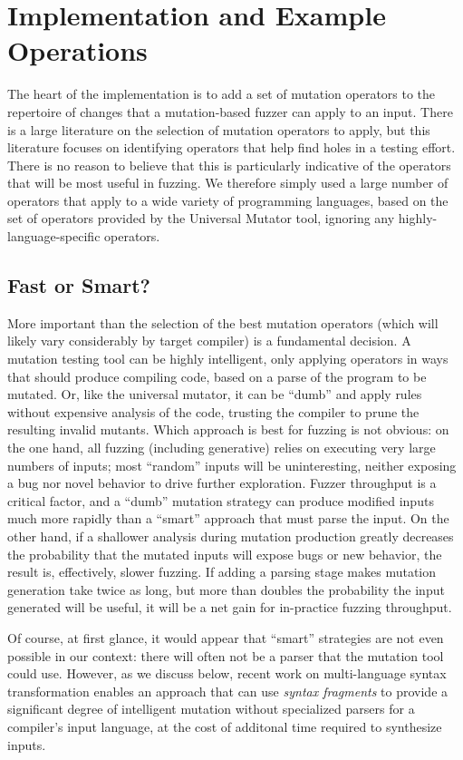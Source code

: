 \section{Implementation and Example Operations}

The heart of the implementation is to add a set of mutation operators
to the repertoire of changes that a mutation-based fuzzer can apply to
an input.  There is a large literature on the selection of mutation
operators to apply, but this literature focuses on identifying
operators that help find holes in a testing effort.  There is no
reason to believe that this is particularly indicative of the
operators that will be most useful in fuzzing.  We therefore simply
used a large number of operators that apply to a wide variety of
programming languages, based on the set of operators provided by the
Universal Mutator tool, ignoring any highly-language-specific operators.

\subsection{Fast or Smart?}

More important than the selection of the best mutation operators
(which will likely vary considerably by target compiler) is a
fundamental decision.  A mutation testing tool can be highly intelligent, only
applying operators in ways that should produce compiling code, based
on a parse of the program to be mutated.  Or, like the universal
mutator, it can be ``dumb'' and apply rules without expensive analysis
of the code, trusting the compiler to prune the resulting invalid
mutants.  Which approach is best for fuzzing is not obvious: on the
one hand, all fuzzing (including generative) relies on executing very
large numbers of inputs; most ``random'' inputs will be uninteresting,
neither exposing a bug nor novel behavior to drive further
exploration.  Fuzzer throughput is a critical factor, and a ``dumb''
mutation strategy can produce modified inputs much more rapidly than a
``smart'' approach that must parse the input.  On the other hand, if a
shallower analysis during mutation production greatly decreases the
probability that the mutated inputs will expose bugs or new behavior,
the result is, effectively, slower fuzzing.  If adding a parsing stage
makes mutation generation take twice as long, but more than doubles
the probability the input generated will be useful, it will be a net
gain for in-practice fuzzing throughput.

Of course, at first
glance, it would appear that  ``smart'' strategies are not even
possible in our context: there will often not be a parser that the
mutation tool could use.  However, as we discuss below, recent work on
multi-language syntax transformation enables an approach that can use
\emph{syntax fragments} to provide a significant degree of intelligent
mutation without specialized parsers for a compiler's input language,
at the cost of additonal time required to synthesize inputs.

